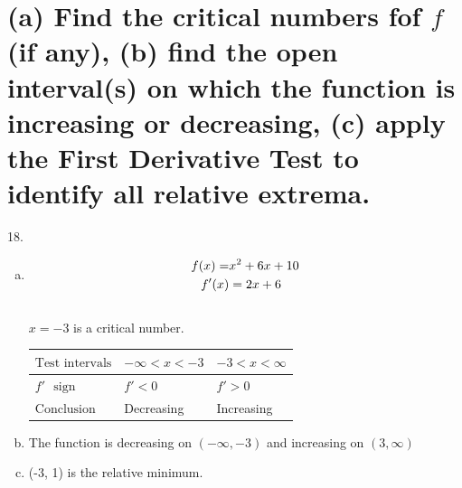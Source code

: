 \documentclass[11pt]{article}
\newcommand*{\set}{\setcounter{equation}{0}}
\begin{document}
\section{(a) Find the critical numbers fof $f$ (if any), (b) find the open interval(s) on which the function is increasing or decreasing, (c) apply the First Derivative Test to identify all relative extrema.}
18.\begin{enumerate}[(a)]
    \item \begin{align}
        \set
        f(x)=&x^2+6x+10\\
        f'(x)&=2x+6
    \end{align}\\
    $x=-3$ is a critical number.
    \begin{flushleft}
        \begin{table}[h]
                \begin{tabular}{|l|l|l|} %
                    \hline
                    $\text{Test intervals}$ & $-\infty<x<-3$ & $-3<x<\infty$\\ \hline
                    $f'\,\,\,\,\text{sign}$ & $f'<0$ & $f'>0$\\ \hline
                    $\text{Conclusion}$ & Decreasing & Increasing\\
                    \hline
             \end{tabular}
            \end{table}
        \end{flushleft}
        \item The function is decreasing on $(-\infty, -3)$ and increasing on $(3, \infty)$\\
        \item (-3, 1) is the relative minimum.
\end{enumerate}
\end{document}
